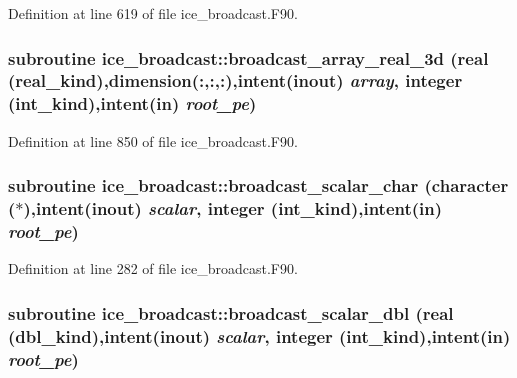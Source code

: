 Definition at line 619 of file ice\_\-broadcast.F90.\hypertarget{namespaceice__broadcast_ae4afcd48d77d13d0acf16f33a390d4c6}{
\subsubsection[{broadcast\_\-array\_\-real\_\-3d}]{\setlength{\rightskip}{0pt plus 5cm}subroutine ice\_\-broadcast::broadcast\_\-array\_\-real\_\-3d (real (real\_\-kind),dimension(:,:,:),intent(inout) {\em array}, \/  integer (int\_\-kind),intent(in) {\em root\_\-pe})}}
\label{namespaceice__broadcast_ae4afcd48d77d13d0acf16f33a390d4c6}


Definition at line 850 of file ice\_\-broadcast.F90.\hypertarget{namespaceice__broadcast_a3adeb2c1c8890bb5af4f4c57a6c969c3}{
\subsubsection[{broadcast\_\-scalar\_\-char}]{\setlength{\rightskip}{0pt plus 5cm}subroutine ice\_\-broadcast::broadcast\_\-scalar\_\-char (character ($\ast$),intent(inout) {\em scalar}, \/  integer (int\_\-kind),intent(in) {\em root\_\-pe})}}
\label{namespaceice__broadcast_a3adeb2c1c8890bb5af4f4c57a6c969c3}


Definition at line 282 of file ice\_\-broadcast.F90.\hypertarget{namespaceice__broadcast_ac16c527490aae65b0e6e231479f259e5}{
\subsubsection[{broadcast\_\-scalar\_\-dbl}]{\setlength{\rightskip}{0pt plus 5cm}subroutine ice\_\-broadcast::broadcast\_\-scalar\_\-dbl (real (dbl\_\-kind),intent(inout) {\em scalar}, \/  integer (int\_\-kind),intent(in) {\em root\_\-pe})}}
\label{namespaceice__broadcast_ac16c527490aae65b0e6e231479f259e5}


